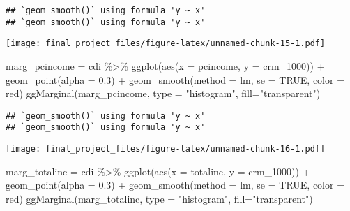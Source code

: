 \documentclass[
]{article}
\newenvironment{Shaded}{\begin{snugshade}}{\end{snugshade}}
\newcommand{\AttributeTok}[1]{\textcolor[rgb]{0.77,0.63,0.00}{#1}}
\newcommand{\ConstantTok}[1]{\textcolor[rgb]{0.00,0.00,0.00}{#1}}
\newcommand{\FloatTok}[1]{\textcolor[rgb]{0.00,0.00,0.81}{#1}}
\newcommand{\FunctionTok}[1]{\textcolor[rgb]{0.00,0.00,0.00}{#1}}
\newcommand{\NormalTok}[1]{#1}
\newcommand{\OtherTok}[1]{\textcolor[rgb]{0.56,0.35,0.01}{#1}}
\newcommand{\SpecialCharTok}[1]{\textcolor[rgb]{0.00,0.00,0.00}{#1}}
\newcommand{\StringTok}[1]{\textcolor[rgb]{0.31,0.60,0.02}{#1}}
\begin{document}
\begin{verbatim}
## `geom_smooth()` using formula 'y ~ x'
## `geom_smooth()` using formula 'y ~ x'
\end{verbatim}

\texttt{[image: final\_project\_files/figure-latex/unnamed-chunk-15-1.pdf]}

\begin{Shaded}
\begin{Highlighting}[]
\NormalTok{marg\_pcincome }\OtherTok{=}\NormalTok{ cdi }\SpecialCharTok{\%\textgreater{}\%} \FunctionTok{ggplot}\NormalTok{(}\FunctionTok{aes}\NormalTok{(}\AttributeTok{x =}\NormalTok{ pcincome, }\AttributeTok{y =}\NormalTok{ crm\_1000)) }\SpecialCharTok{+} \FunctionTok{geom\_point}\NormalTok{(}\AttributeTok{alpha =} \FloatTok{0.3}\NormalTok{) }\SpecialCharTok{+} \FunctionTok{geom\_smooth}\NormalTok{(}\AttributeTok{method =} \StringTok{\textquotesingle{}lm\textquotesingle{}}\NormalTok{, }\AttributeTok{se =} \ConstantTok{TRUE}\NormalTok{, }\AttributeTok{color =} \StringTok{\textquotesingle{}red\textquotesingle{}}\NormalTok{)}
\FunctionTok{ggMarginal}\NormalTok{(marg\_pcincome, }\AttributeTok{type =} \StringTok{"histogram"}\NormalTok{, }\AttributeTok{fill=}\StringTok{"transparent"}\NormalTok{)}
\end{Highlighting}
\end{Shaded}

\begin{verbatim}
## `geom_smooth()` using formula 'y ~ x'
## `geom_smooth()` using formula 'y ~ x'
\end{verbatim}

\texttt{[image: final\_project\_files/figure-latex/unnamed-chunk-16-1.pdf]}

\begin{Shaded}
\begin{Highlighting}[]
\NormalTok{marg\_totalinc }\OtherTok{=}\NormalTok{ cdi }\SpecialCharTok{\%\textgreater{}\%} \FunctionTok{ggplot}\NormalTok{(}\FunctionTok{aes}\NormalTok{(}\AttributeTok{x =}\NormalTok{ totalinc, }\AttributeTok{y =}\NormalTok{ crm\_1000)) }\SpecialCharTok{+} \FunctionTok{geom\_point}\NormalTok{(}\AttributeTok{alpha =} \FloatTok{0.3}\NormalTok{) }\SpecialCharTok{+} \FunctionTok{geom\_smooth}\NormalTok{(}\AttributeTok{method =} \StringTok{\textquotesingle{}lm\textquotesingle{}}\NormalTok{, }\AttributeTok{se =} \ConstantTok{TRUE}\NormalTok{, }\AttributeTok{color =} \StringTok{\textquotesingle{}red\textquotesingle{}}\NormalTok{)}
\FunctionTok{ggMarginal}\NormalTok{(marg\_totalinc, }\AttributeTok{type =} \StringTok{"histogram"}\NormalTok{, }\AttributeTok{fill=}\StringTok{"transparent"}\NormalTok{)}
\end{Highlighting}
\end{Shaded}
\end{document}
